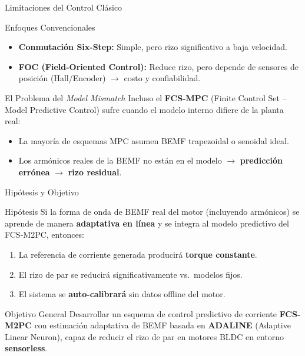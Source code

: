 \begin{frame}{Limitaciones del Control Clásico}
    \begin{block}{Enfoques Convencionales}
        \begin{itemize}
            \item \textbf{Conmutación Six-Step:} Simple, pero rizo significativo a baja velocidad.
            \item \textbf{FOC (Field-Oriented Control):} Reduce rizo, pero depende de sensores de posición (Hall/Encoder) $\rightarrow$ costo y confiabilidad.
        \end{itemize}
    \end{block}
    \vspace{0.3cm}
    \begin{alertblock}{El Problema del \textit{Model Mismatch}}
        Incluso el \textbf{FCS-MPC} (Finite Control Set -- Model Predictive Control) sufre cuando el modelo interno difiere de la planta real:
        \begin{itemize}
            \item La mayoría de esquemas MPC asumen BEMF trapezoidal o senoidal ideal.
            \item Los armónicos reales de la BEMF no están en el modelo $\rightarrow$ \textbf{predicción errónea} $\rightarrow$ \textbf{rizo residual}.
        \end{itemize}
    \end{alertblock}
\end{frame}

\begin{frame}{Hipótesis y Objetivo}
    \begin{block}{Hipótesis}
        Si la forma de onda de BEMF real del motor (incluyendo armónicos) se aprende de manera \textbf{adaptativa en línea} y se integra al modelo predictivo del FCS-M2PC, entonces:
        \begin{enumerate}
            \item La referencia de corriente generada producirá \textbf{torque constante}.
            \item El rizo de par se reducirá significativamente vs.\ modelos fijos.
            \item El sistema se \textbf{auto-calibrará} sin datos offline del motor.
        \end{enumerate}
    \end{block}
    
    \vspace{0.3cm}
    
    \begin{exampleblock}{Objetivo General}
        Desarrollar un esquema de control predictivo de corriente \textbf{FCS-M2PC} con estimación adaptativa de BEMF basada en \textbf{ADALINE} (Adaptive Linear Neuron), capaz de reducir el rizo de par en motores BLDC en entorno \textbf{sensorless}.
    \end{exampleblock}
\end{frame}

